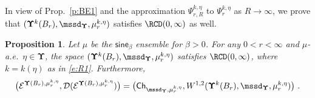 \documentclass[11pt,letterpaper]{amsart}
\newcommand{\Ch}{\mathsf{Ch}}
\newcommand{\dom}[1]{\mathcal D(#1)}
\newcommand{\N}{{\mathbb N}}
\newcommand{\fstop}{\,\,\mathrm{.}}
\newcommand{\purple}[1]{{\color{purple}#1}}
\newcommand{\QP}{{\mu}}
\newcommand{\dUpsilon}{{\mathbf \Upsilon}}
\newcommand{\U}{\dUpsilon}
\newcommand{\sine}{\mathsf{sine}}
\newcommand{\E}{\mathcal E}
\renewcommand{\1}{\mathbf 1}
\numberwithin{equation}{section}
\theoremstyle{plain}
\newtheorem{prop}[thm]{Proposition}%
\theoremstyle{definition}
\theoremstyle{remark}
\begin{document}
 In view of Prop.~\ref{p:BE1} and the approximation $\Psi_{r, R}^{k, \eta}$ to  $\Psi_{r}^{k, \eta}$ as $R \to \infty$, we prove that  $(\U^k(B_r), \mssd_\U, \mu_{r}^{k, \eta})$ satisfies $\RCD(0,\infty)$ as well.
\begin{prop} \label{p:BE2} 
Let $\QP$ be the $\sine_\beta$ ensemble for $\beta>0$. For any $0<r<\infty$ and $\mu$-a.e.\ $\eta \in \U$, 
the space $(\U^k(B_r), \mssd_\U, \mu_{r}^{k, \eta})$ satisfies $\RCD(0, \infty)$, where $k=k(\eta)$ as in \eqref{e:R1}. Furthermore,  
$$\bigl(\E^{\U(B_r), \mu_{r}^{k, \eta}}, \dom{\E^{\U(B_r), \mu_{r}^{k, \eta}}} \bigr)=\bigl(\Ch_{\mssd_\U, \mu_{r}^{k, \eta}}, W^{1,2}(\U^k(B_r), \mssd_\U, \mu_{r}^{k, \eta})\bigr) \fstop$$
\end{prop}
\end{document}
